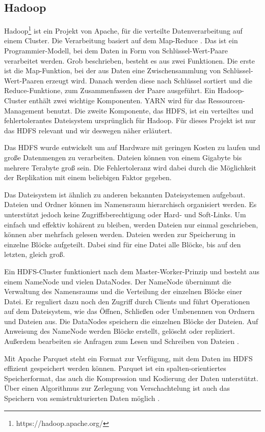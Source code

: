 \subsection{Hadoop}

Hadoop\footnote{https://hadoop.apache.org/} ist ein Projekt von Apache, für die verteilte Datenverarbeitung auf einem Cluster.
Die Verarbeitung basiert auf dem Map-Reduce \parencite{mapred}. 
Das ist ein Programmier-Modell, bei dem Daten in Form von Schlüssel-Wert-Paare verarbeitet werden.
Grob beschrieben, besteht es aus zwei Funktionen.
Die erste ist die Map-Funktion, bei der aus Daten eine Zwischensammlung von Schlüssel-Wert-Paaren erzeugt wird.
Danach werden diese nach Schlüssel sortiert und die Reduce-Funktione, zum Zusammenfassen der Paare ausgeführt.
Ein Hadoop-Cluster enthält zwei wichtige Komponenten.
YARN\parencite{yarn} wird für das Ressourcen-Management benutzt.
Die zweite Komponente, das HDFS, ist ein verteiltes und fehlertolerantes Dateisystem ursprünglich für Hadoop.
Für dieses Projekt ist nur das HDFS relevant und wir deswegen näher erläutert.

Das HDFS wurde entwickelt um auf Hardware mit geringen Kosten zu laufen und große Datenmengen zu verarbeiten.
Dateien können von einem Gigabyte bis mehrere Terabyte groß sein.
Die Fehlertoleranz wird dabei durch die Möglichkeit der Replikation mit einem beliebigen Faktor gegeben.

Das Dateisystem ist ähnlich zu anderen bekannten Dateisystemen aufgebaut.
Dateien und Ordner können im Namensraum hierarchisch organisiert werden.
Es unterstützt jedoch keine Zugriffsberechtigung oder Hard- und Soft-Links.
Um einfach und effektiv kohärent zu bleiben, werden Dateien nur einmal geschrieben, können aber mehrfach gelesen werden.
Dateien werden zur Speicherung in einzelne Blöcke aufgeteilt.
Dabei sind für eine Datei alle Blöcke, bis auf den letzten, gleich groß.

Ein HDFS-Cluster funktioniert nach dem Master-Worker-Prinzip und besteht aus einem NameNode und vielen DataNodes.
Der NameNode übernimmt die Verwaltung des Namensraums und die Verteilung der einzelnen Blöcke einer Datei.
Er reguliert dazu noch den Zugriff durch Clients und führt Operationen auf dem Dateisystem, wie das Öffnen, Schließen oder Umbenennen von Ordnern und Dateien aus.
Die DataNodes speichern die einzelnen Blöcke der Dateien.
Auf Anweisung des NameNode werden Blöcke erstellt, gelöscht oder repliziert.
Außerdem bearbeiten sie Anfragen zum Lesen und Schreiben von Dateien \parencite{hdfs}.

Mit Apache Parquet steht ein Format zur Verfügung, mit dem Daten im HDFS effizient gespeichert werden können.
Parquet ist ein spalten-orientiertes Speicherformat, das auch die Kompression und Kodierung der Daten unterstützt.
Über einen Algorithmus zur Zerlegung von Verschachtelung ist auch das Speichern von semistrukturierten Daten möglich \parencite{parquet}.
